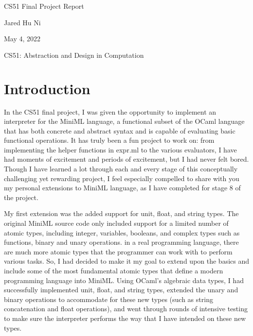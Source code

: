 \documentclass[12pt]{article}
\newcommand\titleofdoc{CS51 Final Project Report} %
\newcommand\GroupName{Jared Hu Ni} %
\begin{document}
\begin{titlepage}
   \begin{center}
        \vspace*{4cm} %

        \Huge{\titleofdoc} 

        \vspace{0.5cm}
            
        \vspace{3 cm}
        \Large{\GroupName}
       
        \vspace{0.25cm}
       
        \vspace{3 cm}
        \Large{May 4, 2022}
        
        \vspace{0.25 cm}
        \Large{CS51: Abstraction and Design in Computation}
       

       \vfill
    \end{center}
\end{titlepage}

\setcounter{page}{1}
\pagestyle{fancy}
\fancyhf{}
\rhead{\thepage}
\lhead{\titleofdoc}

\section{Introduction}

In the CS51 final project, I was given the opportunity to implement an interpreter for the MiniML language, a functional subset of the OCaml language that has both concrete and abstract syntax and is capable of evaluating basic functional operations. It has truly been a fun project to work on: from implementing the helper functions in expr.ml to the various evaluators, I have had moments of excitement and periods of excitement, but I had never felt bored. Though I have learned a lot through each and every stage of this conceptually challenging yet rewarding project, I feel especially compelled to share with you my personal extensions to MiniML language, as I have completed for stage 8 of the project. 

My first extension was the added support for unit, float, and string types. The original MiniML source code only included support for a limited number of atomic types, including integer, variables, booleans, and complex types such as functions, binary and unary operations. in a real programming language, there are much more atomic types that the programmer can work with to perform various tasks. So, I had decided to make it my goal to extend upon the basics and include some of the most fundamental atomic types that define a modern programming language into MiniML. Using OCaml's algebraic data types, I had successfully implemented unit, float, and string types, extended the unary and binary operations to accommodate for these new types (such as string concatenation and float operations), and went through rounds of intensive testing to make sure the interpreter performs the way that I have intended on these new types. 
\end{document}
